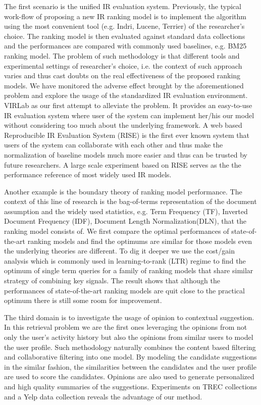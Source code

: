 The first scenario is the unified IR evaluation system. 
Previously, the typical work-flow of proposing a new IR ranking model is to 
implement the algorithm using the most convenient tool (e.g. Indri, Lucene, 
Terrier) of the researcher's choice. 
The ranking model is then evaluated against standard 
data collections and the performances are compared with commonly used 
baselines, e.g. BM25 ranking model. The problem of such methodology is that 
different tools and experimental settings of researcher's choice, i.e. the 
context of such approach varies and thus cast doubts on the real effectiveness 
of the proposed ranking models. 
We have monitored the adverse effect brought by the aforementioned problem and 
explore the usage of the standardized IR evaluation environment. 
VIRLab as our first attempt to alleviate the problem. It provides an 
easy-to-use IR evaluation system where user of the system can implement 
her/his our model without considering too much about the underlying framework. 
A web based Reproducible IR Evaluation System (RISE) is the first ever known 
system that users of the system can collaborate with each other and thus make 
the normalization of baseline models much more easier and thus can be trusted 
by future researchers. A large scale experiment based on RISE serves as the 
the performance reference of most widely used IR models.

Another example is the boundary theory of ranking model performance. 
The context of this line of research is the bag-of-terms representation of 
the document assumption and the widely used statistics, e.g. Term Frequency 
(TF), Inverted Document Frequency (IDF), Document Length Normalization(DLN), 
that the ranking model consists of. We first compare the optimal 
performances of state-of-the-art ranking models and find the optimums 
are similar for those models even the underlying theories are different. 
To dig it deeper we use the cost/gain analysis which is commonly used in 
learning-to-rank (LTR) regime to find the optimum of single term queries for 
a family of ranking models that share similar strategy of combining key 
signals. The result shows that although the performances of state-of-the-art 
ranking models are quit close to the practical optimum there is still some 
room for improvement.

The third domain is to investigate the usage of opinion to contextual 
suggestion. In this retrieval problem we are the first ones leveraging the 
opinions from not only the user's activity history but also the opinions from 
similar users to model the user profile. 
Such methodology naturally combines the content based filtering and 
collaborative filtering into one model. By modeling the candidate suggestions 
in the similar fashion, the similarities between the candidates and the user 
profile are used to score the candidates. Opinions are also used to generate 
personalized and high quality summaries of the suggestions. Experiments on 
TREC collections and a Yelp data collection reveals the advantage of our method.

